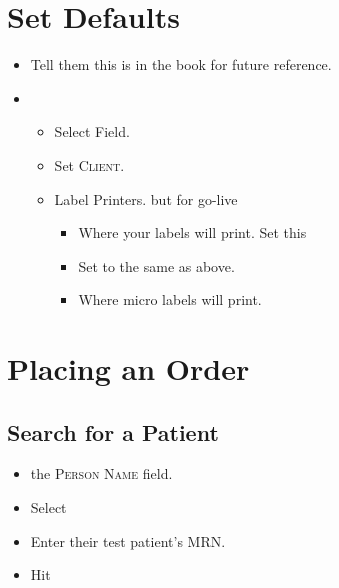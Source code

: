     \section{Set Defaults}
    \begin{itemize}
        \item Tell them this is in the book for future reference.
        \item {}\faArrowRight{}
            \begin{itemize}
                \item Select  Field.
                \item {} Set \textsc{Client}.
                \item Label Printers.  but for go-live
                    \begin{itemize}
                        \item {} Where your labels will print. Set this
                        \item {} Set to the same as above.
                        \item {} Where micro labels will print.
                    \end{itemize}
            \end{itemize}
    \end{itemize}

\section{Placing an Order}
    \subsection{Search for a Patient}
        \begin{itemize}
            \item {} the \textsc{Person Name} field.
            \item Select 
            \item Enter their test patient's MRN.
            \item Hit 
        \end{itemize}

